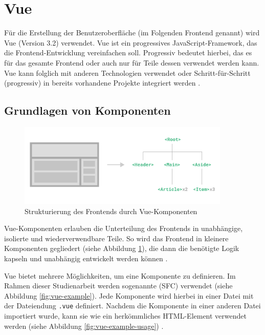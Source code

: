 %
%
\section{Vue}

Für die Erstellung der Benutzeroberfläche (im Folgenden \glqq Frontend\grqq{} genannt) wird Vue (Version 3.2) verwendet. Vue ist ein progressives JavaScript-Framework, das die Frontend-Entwicklung vereinfachen soll. Progressiv bedeutet hierbei, das es für das gesamte Frontend oder auch nur für Teile dessen verwendet werden kann. Vue kann folglich mit anderen Technologien verwendet oder Schritt-für-Schritt (progressiv) in bereits vorhandene Projekte integriert werden \cite[vgl.][]{VueIntroduction}.

%
%
\subsection{Grundlagen von Komponenten}
\begin{figure}[H]
  \includegraphics[width=0.9\textwidth]{images/vue-components.png}
  \centering
  \caption[Vue-Komponenten]{Strukturierung des Frontends durch Vue-Komponenten \cite{VueComponentBasics}}
  \label{fig:vue-components}
\end{figure}

Vue-Komponenten erlauben die Unterteilung des Frontends in unabhängige, isolierte und wiederverwendbare Teile. So wird das Frontend in kleinere Komponenten gegliedert (siehe Abbildung \ref{fig:vue-components}), die dann die benötigte Logik kapseln und unabhängig entwickelt werden können \cite[vgl.][]{VueComponentBasics}.

Vue bietet mehrere Möglichkeiten, um eine Komponente zu definieren. Im Rahmen dieser Studienarbeit werden sogenannte  (\acs{SFC}) verwendet (siehe Abbildung \ref{fig:vue-example}). Jede Komponente wird hierbei in einer Datei mit der Dateiendung \lstinline{.vue} definiert. Nachdem die Komponente in einer anderen Datei importiert wurde, kann sie wie ein herkömmliches HTML-Element verwendet werden (siehe Abbildung \ref{fig:vue-example-usage}) \cite[vgl.][]{VueComponentBasics}.


